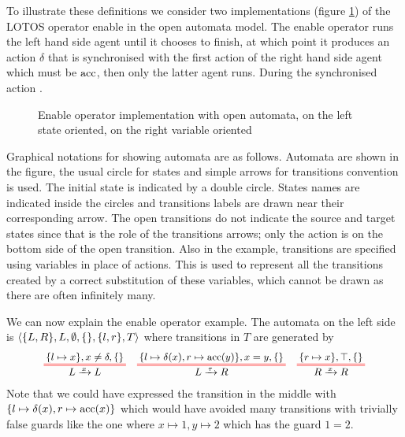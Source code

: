 \documentclass{article}
\begin{document}
To illustrate these definitions we consider  two implementations (figure \ref{fig:enable}) of the LOTOS operator enable in the open automata model.
The enable operator runs  the left hand side agent until it chooses to finish, at which point it produces an action \(\delta\) that is synchronised with the first action of the right hand side agent which must be \(\mathrm{acc}\), then only the latter agent runs.
During the synchronised action .


\begin{exi}
\begin{figure}
\centering

\vrule

\caption{Enable operator implementation with open automata, on the left state oriented, on the right variable oriented}
\label{fig:enable}
\end{figure}

Graphical notations for showing automata are as follows.
Automata are shown in the figure, the usual circle for states and simple arrows for transitions convention is used.
The initial state is indicated by a double circle.
States names are indicated inside the circles and transitions labels are drawn near their corresponding arrow.
The open transitions do not indicate the source and target states since that is the role of the transitions arrows; only the action is on the bottom side of the open transition.
Also in the example, transitions are specified using variables in place of actions.
This is used to represent all the transitions created by a correct substitution of these variables, which cannot be drawn as there are often infinitely many.

We can now explain the enable operator example.
The automata on the left side is \(\left<{\left\{L, R\right\}},L,\emptyset,{\left\{\right\}},{\left\{l, r\right\}},T\right>\) where transitions in \(T\) are generated by
\begin{align*}
	\OT{L}{L}{x}{\mbrc{l \mapsto x}}{x \neq \delta}{\mbrc{}} &&
	\OT{L}{R}{\tau}{\mbrc{l \mapsto \delta\mpar{x}, r \mapsto \act{acc}\mpar{y}}}{x = y}{\mbrc{}} &&
	\OT{R}{R}{x}{\mbrc{r \mapsto x}}{\top}{\mbrc{}}
\end{align*}
Note that we could have expressed the transition in the middle with \({\left\{l \mapsto \delta{\left(x\right)}, r \mapsto \mathrm{acc}{\left(x\right)}\right\}}\) which would have avoided many transitions with trivially false guards like the one where \(x \mapsto 1, y \mapsto 2\) which has the guard \(1 = 2\).


\end{exi}
\end{document}
